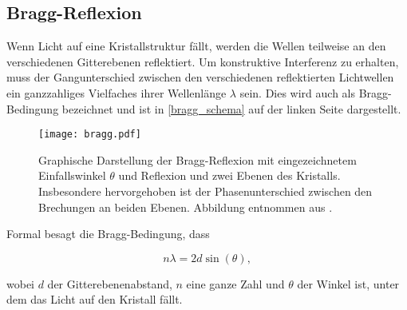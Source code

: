 \subsection{Bragg-Reflexion}
Wenn Licht auf eine Kristallstruktur fällt, werden die Wellen teilweise an den verschiedenen Gitterebenen reflektiert. Um konstruktive Interferenz zu erhalten, muss der Gangunterschied zwischen den verschiedenen reflektierten Lichtwellen ein ganzzahliges Vielfaches ihrer Wellenlänge $\lambda$ sein. Dies wird auch als Bragg-Bedingung bezeichnet und ist in \autoref{bragg_schema} auf der linken Seite dargestellt.
\begin{figure}[H]
	\centering
	\texttt{[image: bragg.pdf]}
	\caption{Graphische Darstellung der Bragg-Reflexion mit eingezeichnetem Einfallswinkel $\theta$ und Reflexion und zwei Ebenen des Kristalls. Insbesondere hervorgehoben ist der Phasenunterschied zwischen den Brechungen an beiden Ebenen. Abbildung entnommen aus \cite{bragg}. }
	\label{bragg_schema}
\end{figure}


Formal besagt die Bragg-Bedingung, dass

\begin{equation}\label{eqn:bragg}
	n\lambda = 2d\sin(\theta),
\end{equation}

wobei \( d \) der Gitterebenenabstand, \( n \) eine ganze Zahl und \( \theta \) der Winkel ist, unter dem das Licht auf den Kristall fällt. 


